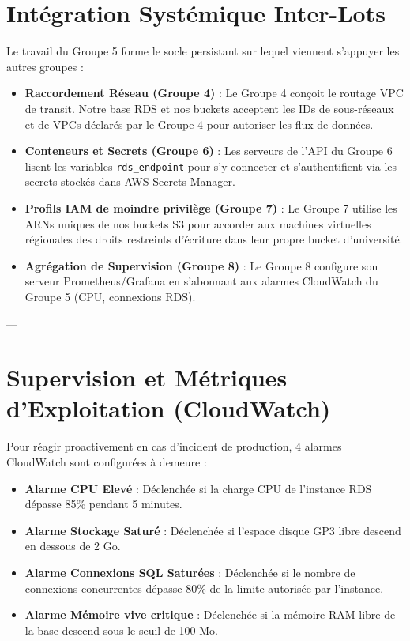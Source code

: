 \documentclass[12pt,a4paper]{article}
\begin{document}
\section{Intégration Systémique Inter-Lots}
Le travail du Groupe 5 forme le socle persistant sur lequel viennent s'appuyer les autres groupes :
\begin{itemize}
    \item \textbf{Raccordement Réseau (Groupe 4)} : Le Groupe 4 conçoit le routage VPC de transit. Notre base RDS et nos buckets acceptent les IDs de sous-réseaux et de VPCs déclarés par le Groupe 4 pour autoriser les flux de données.
    \item \textbf{Conteneurs et Secrets (Groupe 6)} : Les serveurs de l'API du Groupe 6 lisent les variables \texttt{rds\_endpoint} pour s'y connecter et s'authentifient via les secrets stockés dans AWS Secrets Manager.
    \item \textbf{Profils IAM de moindre privilège (Groupe 7)} : Le Groupe 7 utilise les ARNs uniques de nos buckets S3 pour accorder aux machines virtuelles régionales des droits restreints d'écriture dans leur propre bucket d'université.
    \item \textbf{Agrégation de Supervision (Groupe 8)} : Le Groupe 8 configure son serveur Prometheus/Grafana en s'abonnant aux alarmes CloudWatch du Groupe 5 (CPU, connexions RDS).
\end{itemize}

---

\section{Supervision et Métriques d'Exploitation (CloudWatch)}
Pour réagir proactivement en cas d'incident de production, 4 alarmes CloudWatch sont configurées à demeure :
\begin{itemize}
    \item \textbf{Alarme CPU Elevé} : Déclenchée si la charge CPU de l'instance RDS dépasse 85\% pendant 5 minutes.
    \item \textbf{Alarme Stockage Saturé} : Déclenchée si l'espace disque GP3 libre descend en dessous de 2 Go.
    \item \textbf{Alarme Connexions SQL Saturées} : Déclenchée si le nombre de connexions concurrentes dépasse 80\% de la limite autorisée par l'instance.
    \item \textbf{Alarme Mémoire vive critique} : Déclenchée si la mémoire RAM libre de la base descend sous le seuil de 100 Mo.
\end{itemize}
\end{document}
